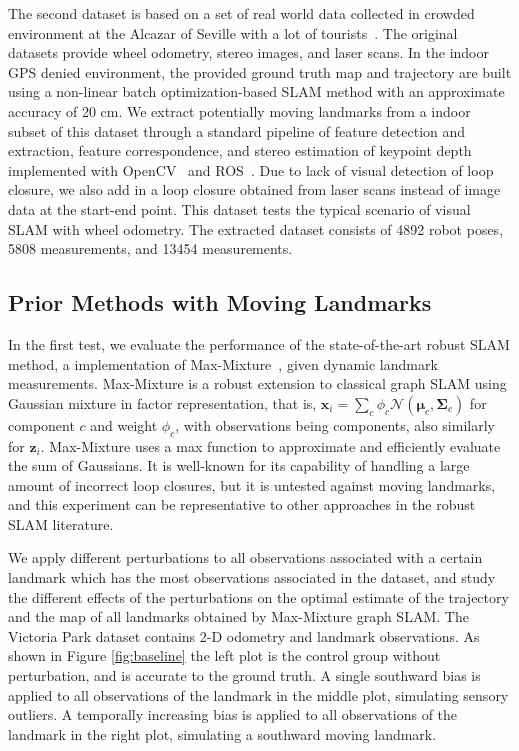 The second dataset is based on a set of real world data collected in crowded
environment at the Alcazar of Seville with a lot of tourists~\cite{iros14-frog}.
The original datasets provide wheel odometry, stereo images, and laser scans.
In the indoor GPS denied environment, the provided ground truth map and
trajectory are built using a non-linear batch optimization-based SLAM method
with an approximate accuracy of 20 cm. We extract potentially moving landmarks
from a indoor subset of this dataset through a standard pipeline of feature
detection and extraction, feature correspondence, and stereo estimation of
keypoint depth implemented with OpenCV~\cite{opencv} and ROS~\cite{ros}. %
Due to lack of visual detection of loop closure, we also add
in a loop closure obtained from laser scans instead of image data at the
start-end point. This dataset tests the typical scenario of visual SLAM with
wheel odometry. The extracted dataset consists of 4892 robot poses, 5808
measurements, and 13454 measurements.

\subsection{Prior Methods with Moving Landmarks}

In the first test, we evaluate the performance of the state-of-the-art robust
SLAM method, a implementation of Max-Mixture~\cite{mm}, given dynamic landmark measurements.
Max-Mixture is a robust extension to classical graph SLAM using Gaussian
mixture in factor representation, that is, $ \boldsymbol{x}_i = \sum_c \phi_c
\mathcal{N}(\boldsymbol{\mu}_c, \boldsymbol{\Sigma}_c)$ for component $c$ and weight $\phi_c$, with
observations being components, also similarly for $\boldsymbol{z}_i$. Max-Mixture uses a max
function to approximate and efficiently evaluate the sum of Gaussians. It is
well-known for its capability of handling a large amount of incorrect loop
closures, but it is untested against moving landmarks, and this experiment can
be representative to other approaches in the robust SLAM literature. 

We apply different perturbations to all observations associated with a certain
landmark which has the most observations associated in the dataset, and study
the different effects of the perturbations on the optimal estimate of the
trajectory and the map of all landmarks obtained by Max-Mixture graph SLAM. The
Victoria Park dataset contains 2-D odometry and landmark observations. As shown
in Figure \ref{fig:baseline} the left plot is the control group without
perturbation, and is accurate to the ground truth. A single southward bias is
applied to all observations of the landmark in the middle plot, simulating
sensory outliers. A temporally increasing bias is applied to all observations
of the landmark in the right plot, simulating a southward moving landmark.

